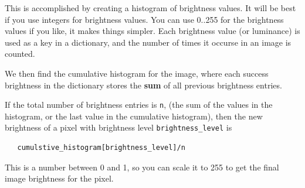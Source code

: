 \documentclass[12pt]{article}
\begin{document}
\begin{description}
This is accomplished by creating a histogram of
brightness values.  It will be best if you use
integers for brightness values. You can use 0..255 for the
brightness values if you like, it makes things
simpler.  Each brightness
value (or luminance) is used as a key in a dictionary,
and the number of times it occurse in an image is
counted.

We then find the cumulative histogram for the image,
where each success brightness in the dictionary
stores the {\bf sum} of all previous brightness
entries.

If the total number of brightness entries is \lstinline{n},
(the sum of the values in the histogram, or the 
last value in the cumulative histogram),
then the new brightness of a pixel with
brightness level \lstinline{brightness_level} is
\begin{lstlisting}
   cumulstive_histogram[brightness_level]/n
\end{lstlisting}
This is a number between 0 and 1, so you can
scale it to 255 to get the final image brightness
for the pixel.


\end{description}
\end{document}
